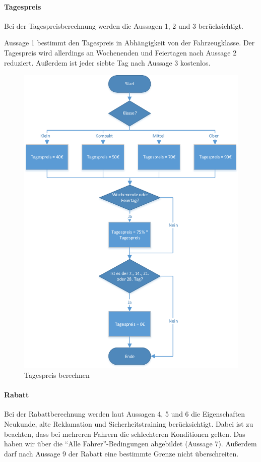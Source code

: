 \paragraph{Tagespreis}

Bei der Tagespreisberechnung werden die Aussagen 1, 2 und 3 berücksichtigt.

Aussage 1 bestimmt den Tagespreis in Abhängigkeit von der Fahrzeugklasse.
Der Tagespreis wird allerdings an Wochenenden und Feiertagen nach Aussage 2
reduziert. Außerdem ist jeder siebte Tag nach Aussage 3 kostenlos.

\begin{figure}[H]
	\centering
	\includegraphics[width=0.9\linewidth]{Bilder/Tagespreis_berechnen}
	\caption{Tagespreis berechnen}
	\label{fig:Tagespreis_berechnen}
\end{figure}

\paragraph{Rabatt}

Bei der Rabattberechnung werden laut Aussagen 4, 5 und 6 die Eigenschaften Neukunde, alte Reklamation
und Sicherheitstraining berücksichtigt. Dabei ist zu beachten, dass bei mehreren Fahrern die
schlechteren Konditionen gelten. Das haben wir über die "`Alle Fahrer"'-Bedingungen abgebildet (Aussage 7). Außerdem darf nach Aussage 9 der Rabatt eine bestimmte Grenze nicht überschreiten.

